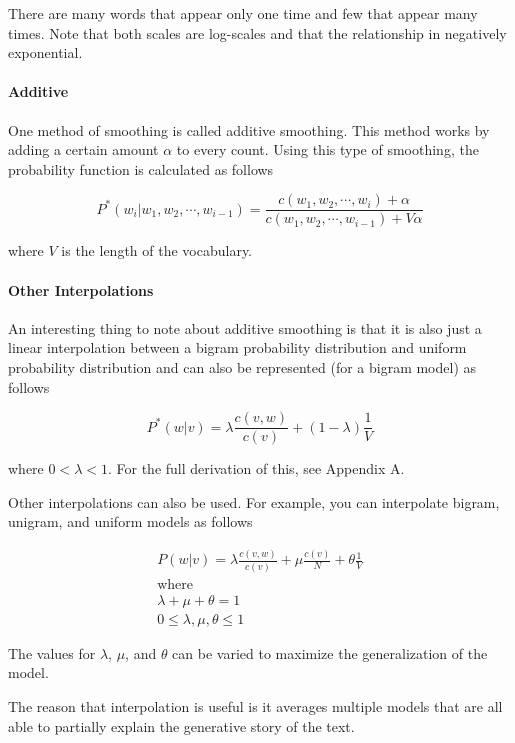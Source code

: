 \documentclass[11pt]{article}
\begin{document}
There are many words that appear only one time and few that appear many times. Note that both scales are log-scales and that the relationship in negatively exponential.

\paragraph{Additive}

One method of smoothing is called additive smoothing. This method works by adding a certain amount $\alpha$ to every count. Using this type of smoothing, the probability function is calculated as follows

$$ P^*\left(w_i \vert w_1, w_2, \cdots, w_{i-1} \right) = \frac{ c\left( w_1, w_2, \cdots, w_i \right) + \alpha}{ c\left( w_1, w_2, \cdots, w_{i-1} \right) + V\alpha } $$

where $V$ is the length of the vocabulary.

\paragraph{Other Interpolations}

An interesting thing to note about additive smoothing is that it is also just a linear interpolation between a bigram probability distribution and uniform probability distribution and can also be represented (for a bigram model) as follows

$$ P^*\left( w \vert v \right) = \lambda \frac{c\left( v, w \right)}{c\left( v\right)} + \left( 1 - \lambda \right) \frac{1}{V} $$

where $0 < \lambda < 1$. For the full derivation of this, see Appendix A.

Other interpolations can also be used. For example, you can interpolate bigram, unigram, and uniform models as follows

\begin{gather*}
P\left( w \vert v \right) = \lambda \frac{c \left(v, w\right)}{c \left(v\right)} + \mu \frac{c \left(v\right)}{N} + \theta \frac{1}{V} \\
\text{where} \\
\lambda + \mu + \theta = 1 \\
0 \leq \lambda, \mu, \theta \leq 1
\end{gather*}

The values for $\lambda$, $\mu$, and $\theta$ can be varied to maximize the generalization of the model.

The reason that interpolation is useful is it averages multiple models that are all able to partially explain the generative story of the text.
\end{document}

